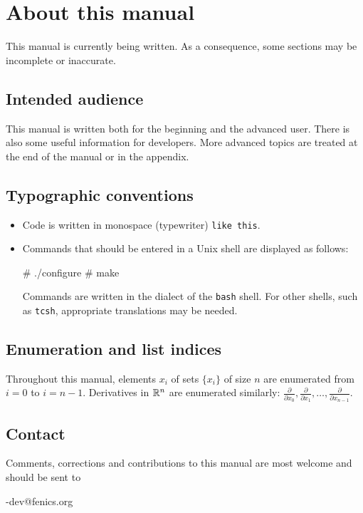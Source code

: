 
\chapter*{About this manual}

This manual is currently being written. As a consequence, some sections
may be incomplete or inaccurate.

\section*{Intended audience}

This manual is written both for the beginning and the advanced user.
There is also some useful information for developers. More advanced topics
are treated at the end of the manual or in the appendix.

\section*{Typographic conventions}

\begin{itemize}
\item
  Code is written in monospace (typewriter) \texttt{like this}.
\item
  Commands that should be entered in a Unix shell
  are displayed as follows:
  \begin{code}
# ./configure
# make
  \end{code}
  Commands are written in the dialect of the \texttt{bash} shell. For
  other shells, such as \texttt{tcsh}, appropriate translations may be
  needed.
\end{itemize}

\section*{Enumeration and list indices}

Throughout this manual, elements $x_i$ of sets $\{x_i\}$ of size $n$
are enumerated from $i = 0$ to $i = n-1$. Derivatives in $\mathbb{R}^n$ are
enumerated similarly:
$\frac{\partial}{\partial x_0}, \frac{\partial}{\partial x_1},
 \ldots, \frac{\partial}{\partial x_{n-1}}$.

\section*{Contact}

Comments, corrections and contributions to this manual are most welcome
and should be sent to
\begin{macrocode}
\packagett{}-dev@fenics.org    
\end{macrocode}
